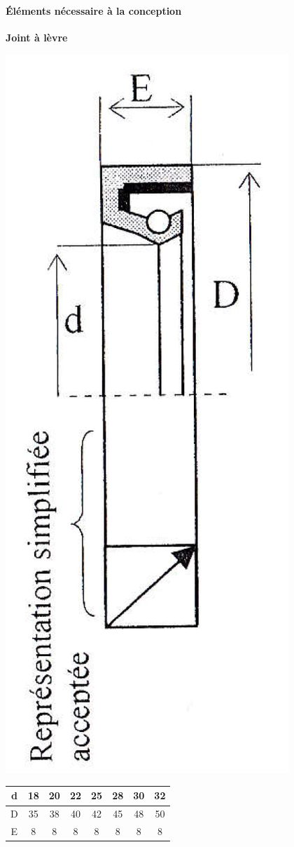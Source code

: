 \paragraph{Éléments nécessaire à la conception}

\textbf{Joint à lèvre}

\begin{minipage}{0.3\linewidth}
 \includegraphics[width=0.6\linewidth]{img/dessin02}
\end{minipage}\hfill
\begin{minipage}{0.65\linewidth}
\begin{tabular}{|c|c|c|c|c|c|c|c|}
\hline
d & 18 & 20 & 22 & 25 & 28 & 30 & 32 \\
\hline
D & 35 & 38 & 40 & 42 & 45 & 48 & 50 \\
\hline
E & 8 & 8 & 8 & 8 & 8 & 8 & 8 \\
\hline
\end{tabular}
\end{minipage}

